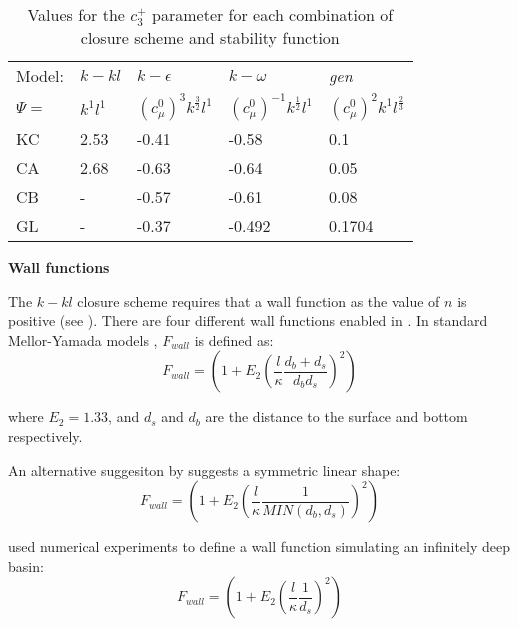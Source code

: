 \begin{table}[b]
\begin{center}
\begin{tabular}{lllll}\hline
Model: & $k-kl$   & $k-\epsilon$                  & $k-\omega$                       & \emph{gen}       \\
$\Psi=$& $k^1l^1$ & $\left(c_\mu^0\right)^3k^\frac{3}{2}l^1$ & $\left(c_\mu^0\right)^{-1}k^\frac{1}{2}l^1$ & $\left(c_\mu^0\right)^2k^1l^\frac{2}{3}$  \\ \hline
KC                   & 2.53            & -0.41          & -0.58         & 0.1         \\
CA                   & 2.68            & -0.63          & -0.64         & 0.05        \\
CB                   &  -              & -0.57          & -0.61         & 0.08        \\
GL                   &  -              & -0.37          & -0.492        & 0.1704      \\
\end{tabular}
\end{center}
\caption{Values for the $c_3^+$ parameter for each combination of closure scheme and stability function}
\label{tab:c3minus}
\end{table}


\par{\textbf{Wall functions}\\}
\label{sec:wall_functions}

The $k-kl$ closure scheme requires that a wall function as the value of $n$ is positive (see \citet{umlauf2003}). There
are four different wall functions enabled in \fluidity. In standard Mellor-Yamada models \citep{mellor1982}, $F_{wall}$ is defined as:
\begin{equation}
F_{wall} = \left(1+E_2 \left(\frac{l}{\kappa} \frac{d_b + d_s}{d_b d_s}\right)^2\right)
\end{equation}

\noindent
where $E_2=1.33$, and $d_s$ and $d_b$ are the distance to the surface and bottom respectively.

An alternative suggesiton by \citet{burchard1998} suggests a symmetric linear shape:
\begin{equation}
F_{wall} = \left(1+E_2 \left(\frac{l}{\kappa} \frac{1}{MIN\left(d_b,d_s\right)}\right)^2\right)
\end{equation}

\citet{burchard2001} used numerical experiments to define a wall function simulating an infinitely deep
basin:
\begin{equation}
F_{wall} = \left(1+E_2 \left(\frac{l}{\kappa} \frac{1}{d_s}\right)^2\right)
\end{equation}

